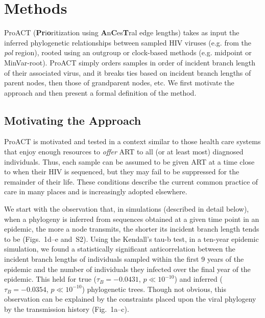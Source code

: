 \documentclass[a4paper,11pt]{article}
\newcommand{\PLWH}{sample\xspace}
\begin{document}
\section{Methods}
ProACT (\textbf{Pr}i\textbf{o}ritization using \textbf{A}n\textbf{C}es\textbf{T}ral edge lengths) takes as input the inferred phylogenetic relationships between sampled HIV viruses (e.g. from the \textit{pol} region), rooted using an outgroup or clock-based methods (e.g. midpoint or MinVar-root\supercite{Mai2017}). 
ProACT simply orders \PLWH{s} in order of incident branch length of their associated virus, and it breaks ties based on incident branch lengths of parent nodes, then those of grandparent nodes, etc.
We first motivate the approach and then present a formal definition of the method.


\subsection{Motivating the Approach}
ProACT is motivated and tested in a context similar to those  health care systems that enjoy enough resources to \textit{offer} ART to all (or at least most) diagnosed individuals.
Thus, each \PLWH can be assumed to be given ART at a time close to when their HIV is sequenced, but they may fail to be suppressed for the remainder of their life.
These conditions describe the current common practice of care in many places and is increasingly adopted elsewhere. %



We start with the observation that, in simulations (described in detail below),
when a phylogeny is inferred from sequences obtained at a given time point in an epidemic,
the more a node transmits, the shorter its incident branch length tends to be
(Figs.~1d--e and~S2).
Using the Kendall's tau-b test,\supercite{Kendall1938} in a ten-year epidemic simulation, we found a statistically significant anticorrelation between the incident branch lengths of individuals sampled within the first 9 years of the epidemic and the number of individuals they infected over the final year of the epidemic. This held for true ($\tau_B=-0.0431$, $p\ll 10^{-10}$) and inferred ($\tau_B=-0.0354$, $p\ll 10^{-10}$) phylogenetic trees.
Though not obvious, this observation can be explained by the constraints placed upon the viral phylogeny by the transmission history (Fig.~1a--c).
\end{document}
